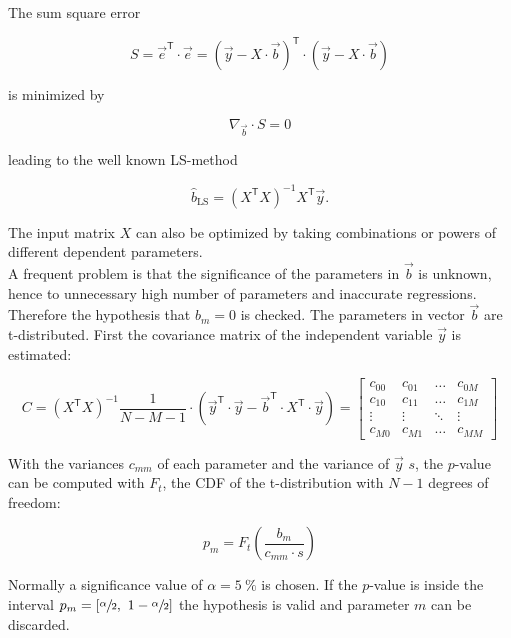 The sum square error

\begin{equation}
S = \vec{e}^{\mathsf T}\cdot\vec{e}=\left(\vec{y}-X\cdot\vec{b}\right)^{\mathsf T}\cdot\left(\vec{y}-X\cdot\vec{b}\right)
\end{equation}

is minimized by 

\begin{equation}
\nabla_{\vec{b}}\cdot S = 0
\end{equation}

leading to the well known \ac{LS}-method

\begin{equation}
\hat{b}_\text{LS}=\left(X^{\mathsf T} X\right)^{-1} X^{\mathsf T}\vec{y}.
\end{equation}

The input matrix $X$ can also be optimized by taking combinations or powers of different dependent parameters.\\
A frequent problem is that the significance of the parameters in $\vec{b}$ is unknown, hence to unnecessary high number of parameters and inaccurate regressions. Therefore the hypothesis that $b_m=0$ is checked. The parameters in vector $\vec{b}$ are t-distributed. First the covariance matrix of the independent variable $\vec{y}$ is estimated: \cite{dffs}

\begin{equation}
C = \left(X^{\mathsf T} X\right)^{-1}\frac{1}{N-M-1}\cdot\left(\vec{y}^{\mathsf T}\cdot\vec{y}-\vec{b}^{\mathsf T}\cdot X^{\mathsf T}\cdot \vec{y}\right) = \begin{bmatrix}
c_{00} & c_{01} & \dots & c_{0M} \\
c_{10} & c_{11} & \dots & c_{1M} \\
\vdots & \vdots & \ddots & \vdots \\
c_{M0} & c_{M1} & \dots & c_{MM}  
\end{bmatrix}
\end{equation}

With the variances $c_{mm}$ of each parameter and the variance of $\vec{y}$ $s$, the $p$-value can be computed with $F_t$, the \ac{CDF} of the t-distribution with $N-1$ degrees of freedom:

\begin{equation}
p_m = F_t\left(\frac{b_m}{c_{mm}\cdot s}\right)
\end{equation}

Normally a significance value of $\alpha = \SI{5}{\percent}$ is chosen. If the $p$-value is inside the interval $p_m=\left[\sfrac{\alpha}{2},\ 1-\sfrac{\alpha}{2}\right]$ the hypothesis is valid and parameter $m$ can be discarded.

